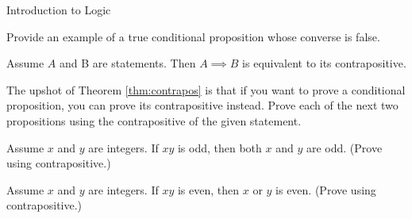 \begin{section}{Introduction to Logic}
\begin{exercise}
Provide an example of a true conditional proposition whose converse is false.
\end{exercise}

\begin{theorem}\label{thm:contrapos}
Assume $A$ and B are statements.  Then ${A\implies B}$ is equivalent to its contrapositive.
\end{theorem}

The upshot of Theorem \ref{thm:contrapos} is that if you want to prove a conditional proposition, you can prove its contrapositive instead.  Prove each of the next two propositions using the contrapositive of the given statement.

\begin{theorem}
Assume $x$ and $y$ are integers.  If $xy$ is odd, then both $x$ and $y$ are odd. (Prove using contrapositive.)
\end{theorem}

\begin{theorem}
Assume $x$ and $y$ are integers.  If $xy$ is even, then $x$ or $y$ is even.  (Prove using contrapositive.)
\end{theorem}

\end{section}